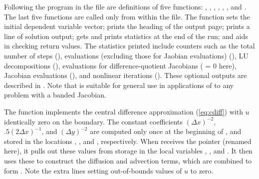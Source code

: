 Following the  program in the  file are definitions of
five functions: , , , , ,
, and .   The last five functions are called
only from within the  file.
The  function sets the initial dependent variable vector;
 prints the heading of the output page;
 prints a line of solution output;
 gets and prints statistics at the end of the run;
and  aids in checking return values.  The statistics
printed include counters such as the total number of steps (), 
 evaluations (excluding those for Jaobian evaluations) (),
LU decompositions (),  evaluations for
difference-quotient Jacobians ( = 0 here),
Jacobian evaluations (), and nonlinear iterations ().
These optional outputs are described in .
Note that  is suitable for general use in applications
of {\cvode} to any problem with a banded Jacobian.

The  function implements the central difference approximation
(\ref{eq:cdiff}) with $u$ identically zero on the boundary. 
The constant coefficients $(\Delta x)^{-2}$, $.5(2 \Delta x)^{-1}$, and 
$(\Delta y)^{-2}$ are computed only once at the beginning of , 
and stored in the locations , , and
, respectively.   When  receives the 
pointer (renamed  here), it pulls out these values from storage
in the local variables , , and .  It then
uses these to construct the diffusion and advection terms, which are
combined to form .  Note the extra lines setting out-of-bounds
values of $u$ to zero.

